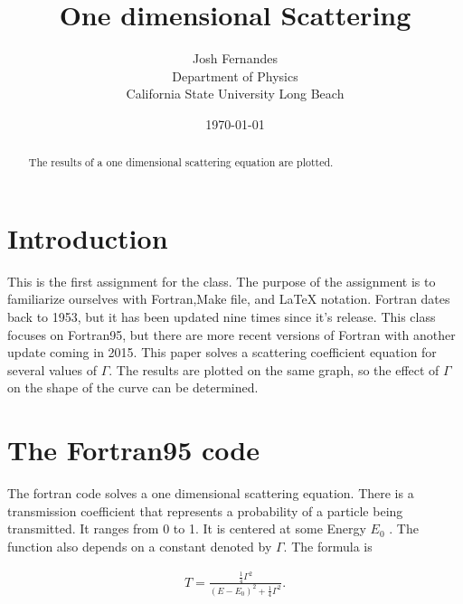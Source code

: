 \documentclass[12pt]{article}
\begin{document}




\title{One dimensional Scattering}
\author{Josh Fernandes \\
Department of Physics\\
California State University Long Beach}
\date{\today }

  
\maketitle



\begin{abstract}
The results of a one dimensional scattering equation are plotted.
\end{abstract}

\section{Introduction}

This is the first assignment for the class. The purpose of the assignment is to familiarize ourselves with Fortran,Make file, and LaTeX notation. Fortran dates back to 1953, but it has been updated nine times since it's release. This class focuses on Fortran95, but there are more recent versions of Fortran with another update coming in 2015. This paper solves a scattering coefficient equation for several values of $\Gamma$. The results are plotted on the same graph, so the effect of $\Gamma$ on the shape of the curve can be determined. 



\section{The Fortran95 code}

The fortran code solves a one dimensional scattering equation. There is a transmission coefficient that represents a probability of a particle being transmitted. It ranges from 0 to 1. It is centered at some Energy ${E}_{0}$ . The function also depends on a constant denoted by $\Gamma$. The formula is 

\begin{gather}
T = \frac{\frac{1}{4}\Gamma^2}{(E-E_0)^2 + \frac{1}{4}\Gamma^2}.
\end{gather}
\end{document}

